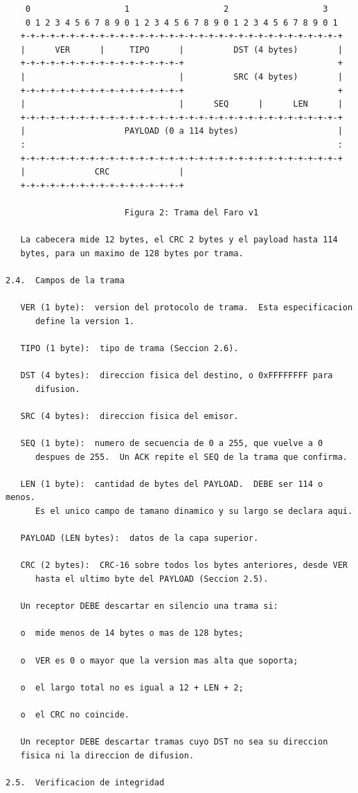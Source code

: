 \newpage
\begin{Verbatim}
    0                   1                   2                   3
    0 1 2 3 4 5 6 7 8 9 0 1 2 3 4 5 6 7 8 9 0 1 2 3 4 5 6 7 8 9 0 1
   +-+-+-+-+-+-+-+-+-+-+-+-+-+-+-+-+-+-+-+-+-+-+-+-+-+-+-+-+-+-+-+-+
   |      VER      |     TIPO      |          DST (4 bytes)        |
   +-+-+-+-+-+-+-+-+-+-+-+-+-+-+-+-+                               +
   |                               |          SRC (4 bytes)        |
   +-+-+-+-+-+-+-+-+-+-+-+-+-+-+-+-+                               +
   |                               |      SEQ      |      LEN      |
   +-+-+-+-+-+-+-+-+-+-+-+-+-+-+-+-+-+-+-+-+-+-+-+-+-+-+-+-+-+-+-+-+
   |                    PAYLOAD (0 a 114 bytes)                    |
   :                                                               :
   +-+-+-+-+-+-+-+-+-+-+-+-+-+-+-+-+-+-+-+-+-+-+-+-+-+-+-+-+-+-+-+-+
   |              CRC              |
   +-+-+-+-+-+-+-+-+-+-+-+-+-+-+-+-+

                        Figura 2: Trama del Faro v1

   La cabecera mide 12 bytes, el CRC 2 bytes y el payload hasta 114
   bytes, para un maximo de 128 bytes por trama.

2.4.  Campos de la trama

   VER (1 byte):  version del protocolo de trama.  Esta especificacion
      define la version 1.

   TIPO (1 byte):  tipo de trama (Seccion 2.6).

   DST (4 bytes):  direccion fisica del destino, o 0xFFFFFFFF para
      difusion.

   SRC (4 bytes):  direccion fisica del emisor.

   SEQ (1 byte):  numero de secuencia de 0 a 255, que vuelve a 0
      despues de 255.  Un ACK repite el SEQ de la trama que confirma.

   LEN (1 byte):  cantidad de bytes del PAYLOAD.  DEBE ser 114 o menos.
      Es el unico campo de tamano dinamico y su largo se declara aqui.

   PAYLOAD (LEN bytes):  datos de la capa superior.

   CRC (2 bytes):  CRC-16 sobre todos los bytes anteriores, desde VER
      hasta el ultimo byte del PAYLOAD (Seccion 2.5).

   Un receptor DEBE descartar en silencio una trama si:

   o  mide menos de 14 bytes o mas de 128 bytes;

   o  VER es 0 o mayor que la version mas alta que soporta;

   o  el largo total no es igual a 12 + LEN + 2;

   o  el CRC no coincide.

   Un receptor DEBE descartar tramas cuyo DST no sea su direccion
   fisica ni la direccion de difusion.

2.5.  Verificacion de integridad
\end{Verbatim}
